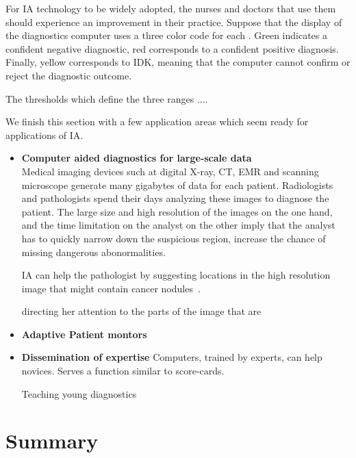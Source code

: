 \documentclass[11pt]{article}
\begin{document}
  For IA technology to be widely adopted, the nurses and doctors that
  use them should experience an improvement in their practice. Suppose
  that the display of the diagnostics computer uses a three color code
  for each . Green indicates a confident
  negative diagnostic, red corresponds to a confident positive
  diagnosis. Finally, yellow corresponds to IDK, meaning that the
  computer cannot confirm or reject the diagnostic outcome.

  The thresholds which define the three ranges .... 


  
  We finish this section with a few application areas which seem ready
  for applications of IA.
  
\begin{itemize}
\item{\bf Computer aided diagnostics for large-scale data}\\
  Medical imaging devices such at digital X-ray, CT, EMR and scanning
  microscope generate many gigabytes of data for each
  patient. Radiologists and pathologists spend their days analyzing
  these images to diagnose the patient. The large size and high
  resolution of the images on the one hand, and the time limitation on
  the analyst on the other imply that the analyst has to quickly
  narrow down the suspicious region, increase the chance of missing
  dangerous abonormalities.

  IA can help the pathologist by suggesting locations in the high
  resolution image that might contain cancer nodules~\cite{}.

  directing her attention to the
  parts of the image that are 

\item{\bf Adaptive Patient montors}
  
\item {\bf Dissemination of expertise}
Computers, trained by experts, can help novices.  Serves a function
similar to score-cards.

Teaching young diagnostics
\end{itemize}

\section*{Summary}

% 

\end{document}
